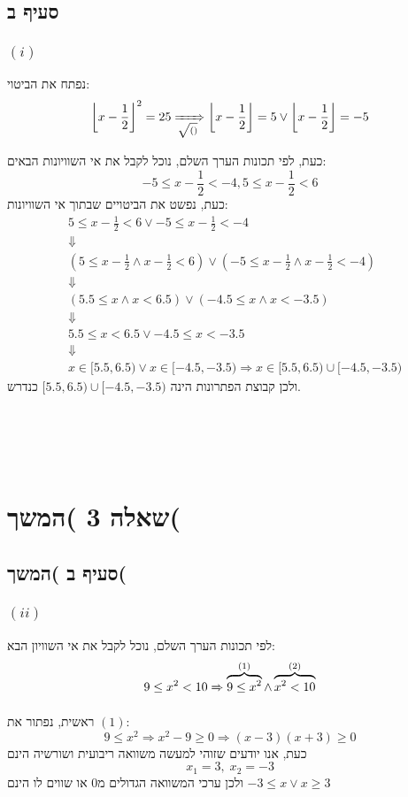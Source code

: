 \documentclass[11pt, oneside]{article}
\newcommand{\qed}{\R{$\blacksquare$}}
\newcommand{\br}{\\\\\\\\\\}
\newcommand{\logr}[1]{\xRightarrow[\text{#1}]{}}
\newcommand{\floor}[1]{\left\lfloor {#1} \right\rfloor}
\begin{document}
\subsection{סעיף ב}
\subsubsection{$(i)$}
נפתח את הביטוי:
\[
\floor{x - \frac{1}{2}}^2 = 25 \logr{$\sqrt{()}$} \floor{x - \frac{1}{2}} = 5 \lor \floor{x - \frac{1}{2}} = -5
\]

כעת, לפי תכונות הערך השלם, נוכל לקבל את אי השוויונות הבאים: 
\[
-5 \le x - \frac{1}{2} < -4, 5 \le x - \frac{1}{2} < 6
\]
כעת, נפשט את הביטויים שבתוך אי השוויונות:
\begin{eqnarray*}
& 5 \le x - \frac{1}{2} < 6 \lor -5 \le x - \frac{1}{2} < -4\\
& \Downarrow\\
& (5 \le x - \frac{1}{2} \land x - \frac{1}{2} < 6) \lor (-5 \le x - \frac{1}{2} \land x - \frac{1}{2} < -4)\\
& \Downarrow\\
& (5.5 \le x \land x < 6.5) \lor (-4.5 \le x \land x < -3.5)\\
& \Downarrow\\
& 5.5 \le x < 6.5 \lor -4.5 \le x < -3.5\\
& \Downarrow\\
& x \in [5.5, 6.5) \lor x \in [-4.5, -3.5) \Rightarrow x \in [5.5, 6.5) \cup [-4.5, -3.5)
\end{eqnarray*}
ולכן קבוצת הפתרונות הינה $[5.5, 6.5) \cup [-4.5, -3.5)$ כנדרש.
\br\qed

\clearpage
\setcounter{section}{2}
\section{שאלה 3 )המשך(}
\setcounter{subsection}{1}
\subsection{סעיף ב )המשך(}
\setcounter{subsubsection}{1}
\subsubsection{$(ii)$}
לפי תכונות הערך השלם, נוכל לקבל את אי השוויון הבא:
\[
9 \le x^2 < 10 \logr{} \overbrace{9 \le x^2}^{(1)} \land \overbrace{x^2 < 10}^{(2)}
\]

ראשית, נפתור את $(1)$:
\[
9 \le x^2 \Rightarrow x^2 - 9 \ge 0 \Rightarrow (x - 3)(x + 3) \ge 0
\]
כעת, אנו יודעים שזוהי למעשה משוואה ריבועית ושורשיה הינם 
\[x_1 = 3,\;x_2 = -3\]
ולכן ערכי המשוואה הגדולים מ$0$ או שווים לו הינם $-3 \le x \lor x \ge 3$
\end{document}
